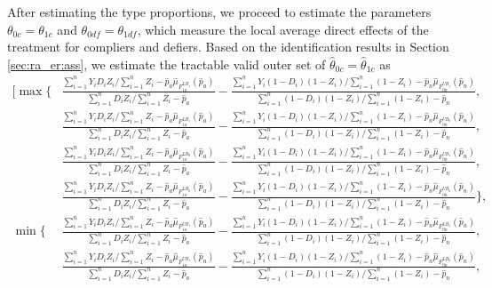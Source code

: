 \documentclass[12pt]{article}
\theoremstyle{plain}
\theoremstyle{definition}
\theoremstyle{remark}
\begin{document}
After estimating the type proportions, we proceed to estimate the parameters $\theta_{0 c}=\theta_{1 c}$ and $\theta_{0 d f}=\theta_{1 d f}$, which measure the local average direct effects of the treatment for compliers and defiers. Based on the identification results in Section \ref{sec:ra_er:ass}, we estimate the tractable valid outer set of $\hat{\theta}_{0 c}=\hat{\theta}_{1 c}$ as
\begin{equation*}
    \begin{aligned}
        \Bigg[ \max \Bigg\{& \frac{\sum_{i=1}^{n}Y_i D_i Z_i / \sum_{i=1}^{n} Z_i - \hat{p}_a \hat{\mu}_{F_{1a}^{LB_1}}(\hat{p}_a)}{\sum_{i=1}^{n} D_i Z_i / \sum_{i=1}^{n} Z_i-\hat{p}_a}-\frac{\sum_{i=1}^{n} Y_i (1-D_i) (1-Z_i) / \sum_{i=1}^{n}(1-Z_i)-\hat{p}_n \hat{\mu}_{F_{0n}^{UB_1}}\left(\hat{p}_n\right)}{\sum_{i=1}^{n} (1-D_i) (1-Z_i) / \sum_{i=1}^{n} (1-Z_i) - \hat{p}_n}, \\
         & \frac{\sum_{i=1}^{n}Y_i D_i Z_i / \sum_{i=1}^{n} Z_i - \hat{p}_a \hat{\mu}_{F_{1a}^{LB_1}}(\hat{p}_a)}{\sum_{i=1}^{n} D_i Z_i / \sum_{i=1}^{n} Z_i-\hat{p}_a}-\frac{\sum_{i=1}^{n} Y_i (1-D_i) (1-Z_i) / \sum_{i=1}^{n}(1-Z_i)-\hat{p}_n \hat{\mu}_{F_{0n}^{UB_0}}\left(\hat{p}_n\right)}{\sum_{i=1}^{n} (1-D_i) (1-Z_i) / \sum_{i=1}^{n} (1-Z_i) - \hat{p}_n}, \\ 
         & \frac{\sum_{i=1}^{n}Y_i D_i Z_i / \sum_{i=1}^{n} Z_i - \hat{p}_a \hat{\mu}_{F_{1a}^{LB_0}}(\hat{p}_a)}{\sum_{i=1}^{n} D_i Z_i / \sum_{i=1}^{n} Z_i-\hat{p}_a}-\frac{\sum_{i=1}^{n} Y_i (1-D_i) (1-Z_i) / \sum_{i=1}^{n}(1-Z_i)-\hat{p}_n \hat{\mu}_{F_{0n}^{UB_1}}\left(\hat{p}_n\right)}{\sum_{i=1}^{n} (1-D_i) (1-Z_i) / \sum_{i=1}^{n} (1-Z_i) - \hat{p}_n}, \\ 
         & \frac{\sum_{i=1}^{n}Y_i D_i Z_i / \sum_{i=1}^{n} Z_i - \hat{p}_a \hat{\mu}_{F_{1a}^{LB_0}}(\hat{p}_a)}{\sum_{i=1}^{n} D_i Z_i / \sum_{i=1}^{n} Z_i-\hat{p}_a}-\frac{\sum_{i=1}^{n} Y_i (1-D_i) (1-Z_i) / \sum_{i=1}^{n}(1-Z_i)-\hat{p}_n \hat{\mu}_{F_{0n}^{UB_0}}\left(\hat{p}_n\right)}{\sum_{i=1}^{n} (1-D_i) (1-Z_i) / \sum_{i=1}^{n} (1-Z_i) - \hat{p}_n} \Bigg\}, \\
         \min \Bigg\{& \frac{\sum_{i=1}^{n}Y_i D_i Z_i / \sum_{i=1}^{n} Z_i - \hat{p}_a \hat{\mu}_{F_{1a}^{UB_1}}(\hat{p}_a)}{\sum_{i=1}^{n} D_i Z_i / \sum_{i=1}^{n} Z_i-\hat{p}_a}-\frac{\sum_{i=1}^{n} Y_i (1-D_i) (1-Z_i) / \sum_{i=1}^{n}(1-Z_i)-\hat{p}_n \hat{\mu}_{F_{0n}^{LB_1}}\left(\hat{p}_n\right)}{\sum_{i=1}^{n} (1-D_i) (1-Z_i) / \sum_{i=1}^{n} (1-Z_i) - \hat{p}_n}, \\
         & \frac{\sum_{i=1}^{n}Y_i D_i Z_i / \sum_{i=1}^{n} Z_i - \hat{p}_a \hat{\mu}_{F_{1a}^{UB_1}}(\hat{p}_a)}{\sum_{i=1}^{n} D_i Z_i / \sum_{i=1}^{n} Z_i-\hat{p}_a}-\frac{\sum_{i=1}^{n} Y_i (1-D_i) (1-Z_i) / \sum_{i=1}^{n}(1-Z_i)-\hat{p}_n \hat{\mu}_{F_{0n}^{LB_0}}\left(\hat{p}_n\right)}{\sum_{i=1}^{n} (1-D_i) (1-Z_i) / \sum_{i=1}^{n} (1-Z_i) - \hat{p}_n}, \\ 

\end{aligned}
\end{equation*}
\end{document}

